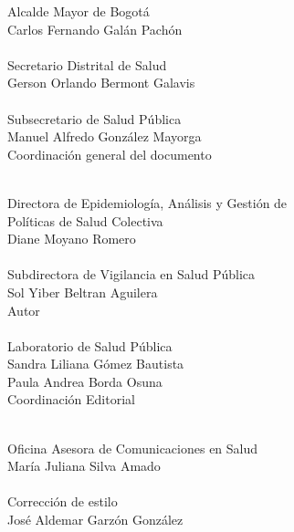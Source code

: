 \documentclass[
]{article}
\author{}
\date{\vspace{-2.5em}2025-02-17}
\begin{document}
\fontsize{11.5}{13}
\selectfont



\begin{center}
{\color{colortitles} Alcalde Mayor de Bogotá\\}
Carlos Fernando Galán Pachón\\~\\


{\color{colortitles} Secretario Distrital de Salud\\}
Gerson Orlando Bermont Galavis\\~\\


{\color{colortitles} Subsecretario de Salud Pública\\}
Manuel Alfredo González Mayorga\\[0.4in]


{\color{colortitles} Coordinación general del documento\\~\\}


{\color{colortitles} Directora de Epidemiología, Análisis y Gestión de\\ 
Políticas de Salud Colectiva\\}
Diane Moyano Romero\\~\\


{\color{colortitles} Subdirectora de Vigilancia en Salud Pública\\}
Sol Yiber Beltran Aguilera\\[0.5in]


{\color{colortitles} Autor\\~\\}
{\color{colortitles} Laboratorio de Salud Pública\\}
Sandra Liliana Gómez Bautista\\
Paula Andrea Borda Osuna\\[0.6in]


{\color{colortitles} Coordinación Editorial\\~\\}

{\color{colortitles} Oficina Asesora de Comunicaciones en Salud\\}
María Juliana Silva Amado\\~\\


{\color{colortitles} Corrección de estilo\\}
José Aldemar Garzón González\\~\\



\end{center}
\end{document}
